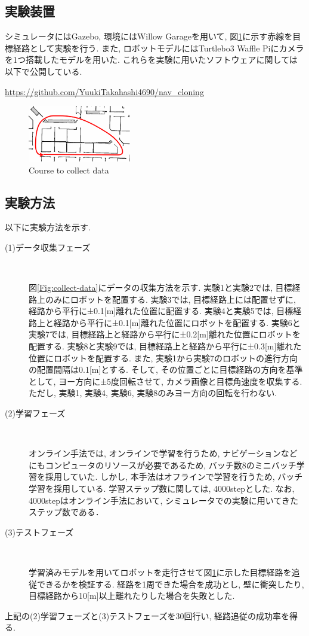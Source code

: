 \documentclass{ujarticle}
\begin{document}
\subsection{実験装置}シミュレータにはGazebo\cite{gazebo}, 環境にはWillow Garage\cite{willow}を用いて, 図\ref{Fig:willow}に示す赤線を目標経路として実験を行う. また, ロボットモデルにはTurtlebo3 Waffle Pi\cite{turtlebot3}にカメラを1つ搭載したモデルを用いた. これらを実験に用いたソフトウェアに関しては以下で公開している. \par \url{https://github.com/YuukiTakahashi4690/nav_cloning}

\begin{figure}[h]
		\centering
		\includegraphics[width=0.4\textwidth]{img/willow-path.png}
		\caption{Course to collect data}
		\label{Fig:willow}
\end{figure}

\subsection{実験方法}
以下に実験方法を示す. 
\begin{description}
		\item[(1)データ収集フェーズ]　
		
		図\ref{Fig:collect-data}にデータの収集方法を示す. 実験1と実験2では, 目標経路上のみにロボットを配置する. 実験3では, 目標経路上には配置せずに, 経路から平行に±0.1[m]離れた位置に配置する. 実験4と実験5では, 目標経路上と経路から平行に±0.1[m]離れた位置にロボットを配置する. 実験6と実験7では, 目標経路上と経路から平行に±0.2[m]離れた位置にロボットを配置する. 実験8と実験9では, 目標経路上と経路から平行に±0.3[m]離れた位置にロボットを配置する. また, 実験1から実験7のロボットの進行方向の配置間隔は0.1[m]とする. そして, その位置ごとに目標経路の方向を基準として, ヨー方向に±5度回転させて, カメラ画像と目標角速度を収集する. ただし, 実験1, 実験4, 実験6, 実験8のみヨー方向の回転を行わない. 
		\item[(2)学習フェーズ]　
		
		オンライン手法では, オンラインで学習を行うため, ナビゲーションなどにもコンピュータのリソースが必要であるため, バッチ数8のミニバッチ学習を採用していた. しかし, 本手法はオフラインで学習を行うため, バッチ学習を採用している. 学習ステップ数に関しては, 4000stepとした. なお, 4000stepはオンライン手法において, シミュレータでの実験に用いてきたステップ数である． 
		\item[(3)テストフェーズ]　
		
		学習済みモデルを用いてロボットを走行させて図\ref{Fig:willow}に示した目標経路を追従できるかを検証する. 経路を1周できた場合を成功とし, 壁に衝突したり, 目標経路から10[m]以上離れたりした場合を失敗とした.
\end{description}
上記の(2)学習フェーズと(3)テストフェーズを30回行い, 経路追従の成功率を得る. 
\end{document}
